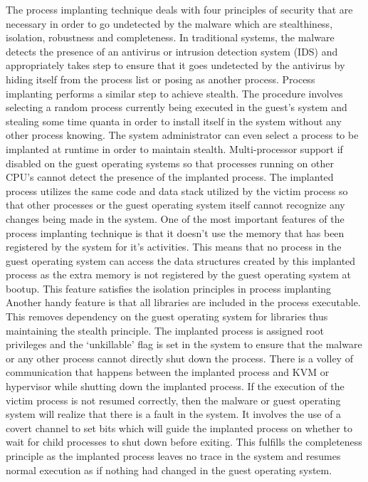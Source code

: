 \documentclass[11pt]{article}
\begin{document}
	The process implanting technique deals with four principles of security that are necessary in order to go undetected by the malware which are stealthiness, isolation, robustness and completeness. In traditional systems, the malware detects the presence of an antivirus or intrusion detection system (IDS) and appropriately takes step to ensure that it goes undetected by the antivirus by hiding itself from the process list or posing as another process. Process implanting performs a similar step to achieve stealth. The procedure involves selecting a random process currently being executed in the guest’s system and stealing some time quanta in order to install itself in the system without any other process knowing. The system administrator can even select a process to be implanted at runtime in order to maintain stealth. Multi-processor support if disabled on the guest operating systems so that processes running on other CPU’s cannot detect the presence of the implanted process. The implanted process utilizes the same code and data stack utilized by the victim process so that other processes or the guest operating system itself cannot recognize any changes being made in the system. One of the most important features of the process implanting technique is that it doesn’t use the memory that has been registered by the system for it’s activities. This means that no process in the guest operating system can access the data structures created by this implanted process as the extra memory is not registered by the guest operating system at bootup. This feature satisfies the isolation principles in process implanting Another handy feature is that all libraries are included in the process executable. This removes dependency on the guest operating system for libraries thus maintaining the stealth principle. The implanted process is assigned root privileges and the ‘unkillable’ flag is set in the system to ensure that the malware or any other process cannot directly shut down the process. There is a volley of communication that happens between the implanted process and KVM or hypervisor while shutting down the implanted process. If the execution of the victim process is not resumed correctly, then the malware or guest operating system will realize that there is a fault in the system. It involves the use of a covert channel to set bits which will guide the implanted process on whether to wait for child processes to shut down before exiting. This fulfills the completeness principle as the implanted process leaves no trace in the system and resumes normal execution as if nothing had changed in the guest operating system. 
\end{document}

